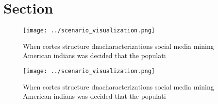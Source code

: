 \documentclass[a4paper]{article}
\begin{document}
\section{Section}

\begin{figure}
\centering
\texttt{[image: ../scenario\_visualization.png]}
\caption{When cortes structure dnacharacterizations social media mining American indians was decided that the populati
}
\end{figure}
 
\begin{figure}
\centering
\texttt{[image: ../scenario\_visualization.png]}
\caption{When cortes structure dnacharacterizations social media mining American indians was decided that the populati
}
\end{figure}
 
\end{document}
